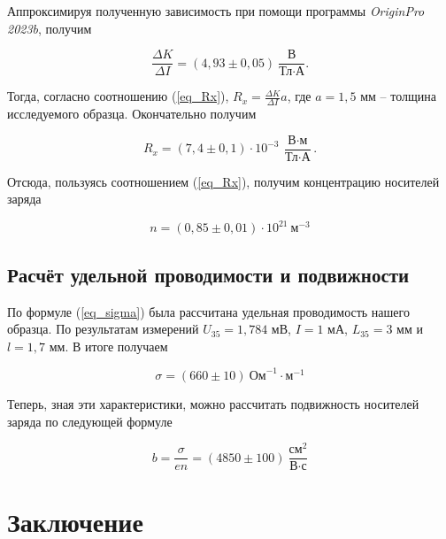\documentclass[a4paper, 12pt]{article}
\begin{document}
     Аппроксимируя полученную зависимость при помощи программы \textit{OriginPro 2023b}, получим

     \begin{equation}
         \frac{\Delta K}{\Delta I} = \left( 4,93 \pm 0,05 \right) \: \frac{\text{В}}{\text{Тл} \cdot \text{А}}.
     \end{equation}

     Тогда, согласно соотношению (\ref{eq_Rx}), $R_x = \frac{\Delta K}{\Delta I} a$, где $a = 1,5$ мм -- толщина исследуемого образца. Окончательно получим

     \begin{equation}
         \boxed{R_x = \left( 7,4 \pm 0,1 \right) \cdot 10^{-3} \: \frac{\text{В} \cdot \text{м}}{\text{Тл} \cdot \text{А}}}.
     \end{equation}

     Отсюда, пользуясь соотношением (\ref{eq_Rx}), получим концентрацию носителей заряда

     \begin{equation}
         n = \left( 0,85 \pm 0,01 \right) \cdot 10^{21} \: \text{м}^{-3} 
     \end{equation}

     \subsection{Расчёт удельной проводимости и подвижности}

     По формуле (\ref{eq_sigma}) была рассчитана удельная проводимость нашего образца. По результатам измерений $U_{35} = 1,784$ мВ, $I = 1$ мА, $L_{35} = 3$ мм и $l = 1,7$ мм. В итоге получаем

    \begin{equation}
        \sigma = \left( 660 \pm 10 \right) \: \text{Ом}^{-1} \cdot \text{м}^{-1}
    \end{equation}
     
    Теперь, зная эти характеристики, можно рассчитать подвижность носителей заряда по следующей формуле

    \begin{equation}
        b = \frac{\sigma}{en} = \left( 4850 \pm 100 \right) \: \frac{\text{см}^2}{\text{В} \cdot \text{с}}
    \end{equation}


    \section{Заключение}
\end{document}
